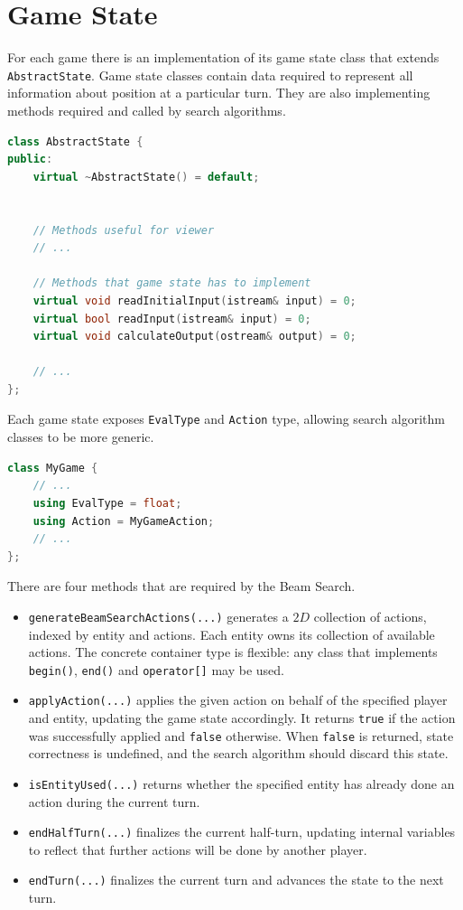 \documentclass[shortabstract, mgr, english]{iithesis}
\begin{document}
\section{Game State}
For each game there is an implementation of its game state class that extends \texttt{AbstractState}. Game state classes contain data required to represent all information about position at a particular turn. They are also implementing methods required and called by search algorithms.

\begin{lstlisting}[language=C++, caption=Base class for game states, label={lst:AbstractState}]
class AbstractState {
public:
    virtual ~AbstractState() = default;

    
    // Methods useful for viewer
    // ...

    // Methods that game state has to implement    
    virtual void readInitialInput(istream& input) = 0;
    virtual bool readInput(istream& input) = 0;
    virtual void calculateOutput(ostream& output) = 0;

    // ...
};
\end{lstlisting}
Each game state exposes \texttt{EvalType} and \texttt{Action} type, allowing search algorithm classes to be more generic.
\begin{lstlisting}[language=C++, caption=Game state types, label={lst:GameStateTypes}]
class MyGame {
    // ...
    using EvalType = float;
    using Action = MyGameAction;
    // ...
};
\end{lstlisting}
There are four methods that are required by the Beam Search.
\begin{itemize}
    \item \texttt{generateBeamSearchActions(...)} generates a $2D$ collection of actions, indexed by entity and actions. Each entity owns its collection of available actions. The concrete container type is flexible: any class that implements \texttt{begin()}, \texttt{end()} and \texttt{operator[]} may be used.
    \item \texttt{applyAction(...)} applies the given action on behalf of the specified player and entity, updating the game state accordingly. It returns \texttt{true} if the action was successfully applied and \texttt{false} otherwise. When \texttt{false} is returned, state correctness is undefined, and the search algorithm should discard this state.
    \item \texttt{isEntityUsed(...)} returns whether the specified entity has already done an action during the current turn.
    \item \texttt{endHalfTurn(...)} finalizes the current half-turn, updating internal variables to reflect that further actions will be done by another player.
    \item \texttt{endTurn(...)} finalizes the current turn and advances the state to the next turn.
\end{itemize}
\end{document}
